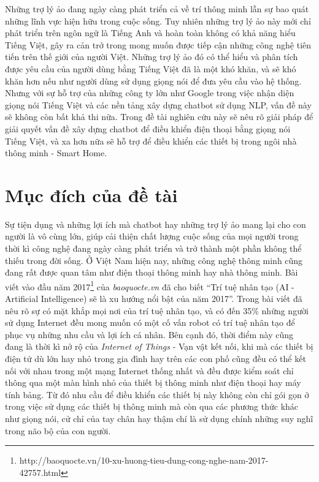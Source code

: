 \documentclass[12pt]{report}
\begin{document}
Những trợ lý ảo đang ngày càng phát triển cả về trí thông minh lẫn sự bao quát những lĩnh vực hiện hữu trong cuộc sống. Tuy nhiên những trợ lý ảo này mới chỉ phát triển trên ngôn ngữ là Tiếng Anh và hoàn toàn không có khả năng hiểu Tiếng Việt, gây ra cản trở trong mong muốn được tiếp cận những công nghệ tiên tiến trên thế giới của người Việt. Những trợ lý ảo đó có thể hiểu và phân tích được yêu cầu của người dùng bằng Tiếng Việt đã là một khó khăn, và sẽ khó khăn hơn nếu như người dùng sử dụng giọng nói để đưa yêu cầu vào hệ thống. Nhưng với sự hỗ trợ của những công ty lớn như Google trong việc nhận diện giọng nói Tiếng Việt và các nền tảng xây dựng chatbot sử dụng NLP, vấn đề này sẽ không còn bất khả thi nữa. Trong đề tài nghiên cứu này sẽ nêu rõ giải pháp để giải quyết vấn đề xây dựng chatbot để điều khiển điện thoại bằng giọng nói Tiếng Việt, và xa hơn nữa sẽ hỗ trợ để điều khiển các thiết bị trong ngôi nhà thông minh - Smart Home.

\section{Mục đích của đề tài}

Sự tiện dụng và những lợi ích mà chatbot hay những trợ lý ảo mang lại cho con người là vô cùng lớn, giúp cải thiện chất lượng cuộc sống của mọi người trong thời kì công nghệ đang ngày càng phát triển và trở thành một phần không thể thiếu trong đời sống. Ở Việt Nam hiện nay, những công nghệ thông minh cũng đang rất được quan tâm như điện thoại thông minh hay nhà thông minh. Bài viết vào đầu năm 2017{\footnote{http://baoquocte.vn/10-xu-huong-tieu-dung-cong-nghe-nam-2017-42757.html}} của \textit{baoquocte.vn} đã cho biết ``Trí tuệ nhân tạo (AI - Artificial Intelligence) sẽ là xu hướng nổi bật của năm 2017''. Trong bài viết đã nêu rõ sự có mặt khắp mọi nơi của trí tuệ nhân tạo, và có đến 35\% những người sử dụng Internet đều mong muốn có một cố vấn robot có trí tuệ nhân tạo để phục vụ những nhu cầu và lợi ích cá nhân. Bên cạnh đó, thời điểm này cũng đang là thời kì nở rộ của \textit{Internet of Things} - Vạn vật kết nối, khi mà các thiết bị điện tử dù lớn hay nhỏ trong gia đình hay trên các con phố cũng đều có thể kết nối với nhau trong một mạng Internet thống nhất và đều được kiểm soát chỉ thông qua một màn hình nhỏ của thiết bị thông minh như điện thoại hay máy tính bảng. Từ đó nhu cầu để điều khiển các thiết bị này không còn chỉ gói gọn ở trong việc sử dụng các thiết bị thông minh mà còn qua các phương thức khác như giọng nói, cử chỉ của tay chân hay thậm chí là sử dụng chính những suy nghĩ trong não bộ của con người.
\end{document}
